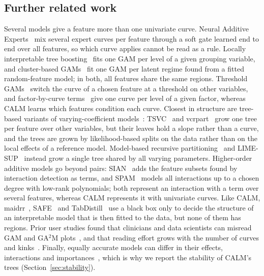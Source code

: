\subsection{Further related work}\label{app:further-related-work}
Several models give a feature more than one univariate curve.
Neural Additive Experts~\cite{xiong2026neural} mix several expert curves per feature through a soft gate learned end to end over all features, so which curve applies cannot be read as a rule.
Locally interpretable tree boosting~\cite{hjort2024locally} fits one GAM per level of a given grouping variable, and cluster-based GAMs~\cite{huang2025cluster} fit one GAM per latent regime found from a fitted random-feature model; in both, all features share the same regions.
Threshold GAMs~\cite{ciannelli2004nonadditive} switch the curve of a chosen feature at a threshold on other variables, and factor-by-curve terms~\cite{coull2001simple} give one curve per level of a given factor, whereas CALM learns which features condition each curve.
Closest in structure are tree-based variants of varying-coefficient models~\cite{hastie1993varying}: TSVC~\cite{berger2019tree} and vcrpart~\cite{burgin2017coefficient} grow one tree per feature over other variables, but their leaves hold a slope rather than a curve, and the trees are grown by likelihood-based splits on the data rather than on the local effects of a reference model.
Model-based recursive partitioning~\cite{zeileis2008model, seibold2019generalised} and LIME-SUP~\cite{hu2018locally} instead grow a single tree shared by all varying parameters.
Higher-order additive models go beyond pairs: SIAN~\cite{enouen2022sparse} adds the feature subsets found by interaction detection as terms, and SPAM~\cite{dubey2022scalable} models all interactions up to a chosen degree with low-rank polynomials; both represent an interaction with a term over several features, whereas CALM represents it with univariate curves.
Like CALM, maidrr~\cite{henckaerts2022when}, SAFE~\cite{gosiewska2021simpler} and TabDistill~\cite{jia2026selecting} use a black box only to decide the structure of an interpretable model that is then fitted to the data, but none of them has regions.
Prior user studies found that clinicians and data scientists can misread GAM and GA$^2$M plots~\cite{hegselmann2020evaluation, kaur2020interpreting}, and that reading effort grows with the number of curves and kinks~\cite{abdul2020cogam, kruschel2025quantifying}.
Finally, equally accurate models can differ in their effects, interactions and importances~\cite{biecek2024performance, li2024exploring, cavus2025beyond, ewald2026cashomon}, which is why we report the stability of CALM's trees (Section~\ref{sec:stability}).

